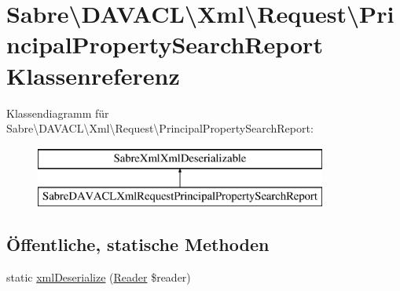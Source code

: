 \hypertarget{class_sabre_1_1_d_a_v_a_c_l_1_1_xml_1_1_request_1_1_principal_property_search_report}{}\section{Sabre\textbackslash{}D\+A\+V\+A\+CL\textbackslash{}Xml\textbackslash{}Request\textbackslash{}Principal\+Property\+Search\+Report Klassenreferenz}
\label{class_sabre_1_1_d_a_v_a_c_l_1_1_xml_1_1_request_1_1_principal_property_search_report}
Klassendiagramm für Sabre\textbackslash{}D\+A\+V\+A\+CL\textbackslash{}Xml\textbackslash{}Request\textbackslash{}Principal\+Property\+Search\+Report\+:\begin{figure}[H]
\begin{center}
\leavevmode
\includegraphics[height=2.000000cm]{class_sabre_1_1_d_a_v_a_c_l_1_1_xml_1_1_request_1_1_principal_property_search_report}
\end{center}
\end{figure}
\subsection*{Öffentliche, statische Methoden}
\begin{DoxyCompactItemize}
\item 
static \mbox{\hyperlink{class_sabre_1_1_d_a_v_a_c_l_1_1_xml_1_1_request_1_1_principal_property_search_report_adcdda4157381d5c0586f4b3ebc74aab7}{xml\+Deserialize}} (\mbox{\hyperlink{class_sabre_1_1_xml_1_1_reader}{Reader}} \$reader)
\end{DoxyCompactItemize}
